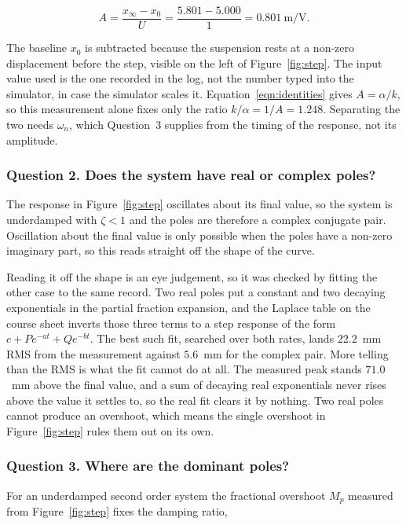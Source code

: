 \begin{equation}\label{eqn:gain}
    A = \frac{x_\infty - x_0}{U} = \frac{5.801 - 5.000}{1} = 0.801~\text{m/V}.
\end{equation}

The baseline $x_0$ is subtracted because the suspension rests at a non-zero displacement
before the step, visible on the left of Figure~\ref{fig:step}. The input value used is the
one recorded in the log, not the number typed into the simulator, in case the
simulator scales it. Equation~\ref{eqn:identities} gives $A = \alpha/k$, so this measurement
alone fixes only the ratio $k/\alpha = 1/A = 1.248$. Separating the two needs $\omega_n$,
which Question~3 supplies from the timing of the response, not its amplitude.

\subsubsection*{Question 2. Does the system have real or complex poles?}

The response in Figure~\ref{fig:step} oscillates about its final value, so the system is
underdamped with $\zeta < 1$ and the poles are therefore a complex conjugate pair. Oscillation
about the final value is only possible when the poles have a non-zero imaginary part, so this
reads straight off the shape of the curve.

Reading it off the shape is an eye judgement, so it was checked by fitting the other case to
the same record. Two real poles put a constant and two decaying exponentials in the partial
fraction expansion, and the Laplace table on the course sheet inverts those three terms to a
step response of the form $c + Pe^{-at} + Qe^{-bt}$. The best such fit, searched over both
rates, lands
$22.2$~mm RMS from the measurement against $5.6$~mm for the complex pair. More telling than
the RMS is what the fit cannot do at all. The measured peak stands $71.0$~mm above the final
value, and a sum of decaying real exponentials never rises above the value it settles to,
so the real fit clears it by nothing. Two real poles cannot produce an overshoot, which
means the single overshoot in Figure~\ref{fig:step} rules them out on its own.

\subsubsection*{Question 3. Where are the dominant poles?}

For an underdamped second order system the fractional overshoot $M_p$ measured from
Figure~\ref{fig:step} fixes the damping ratio,

